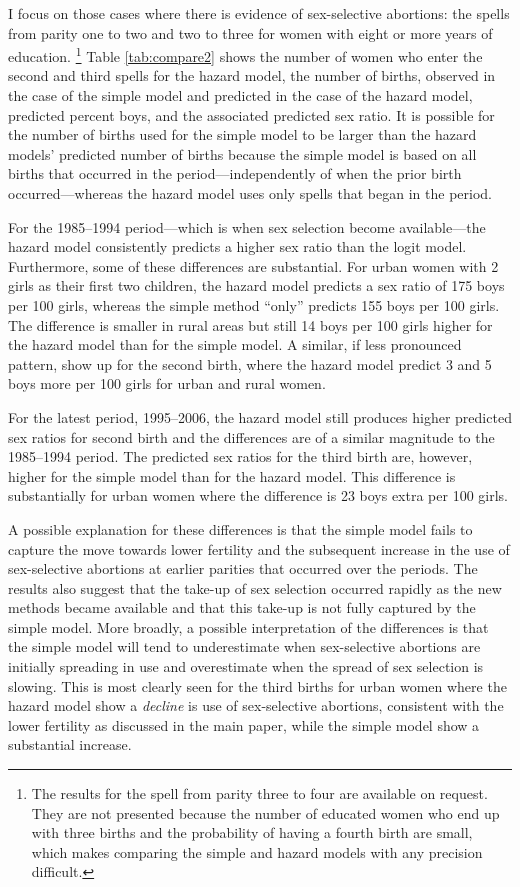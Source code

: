 \documentclass[12pt,letterpaper]{article}
\begin{document}
I focus on those cases where there is evidence of sex-selective abortions: the spells
from parity one to two and two to three for women with eight or more years of education.%
\footnote{
The results for the spell from parity three to four are available on request.
They are not presented because the number of educated women who end up with three births 
and the probability of having a fourth birth are small, which makes
comparing the simple and hazard models with any precision difficult.
}
Table \ref{tab:compare2} shows the number of women who enter the second and third spells
for the hazard model,
the number of births, observed in the case of the simple model and predicted in the case 
of the hazard model, predicted percent boys, and the associated predicted sex ratio.
It is possible for the number of births used for the simple model to be larger than the
hazard models' predicted number of births because the simple model is based
on all births that occurred in the period---independently of when the prior birth
occurred---whereas the hazard model uses only spells that began in the period. 




For the 1985--1994 period---which is when sex selection become available---the 
hazard model consistently predicts a higher sex ratio than the logit model.
Furthermore, some of these differences are substantial.
For urban women with 2 girls as their first two children, the hazard model
predicts a sex ratio of 175 boys per 100 girls, whereas the simple method
``only'' predicts 155 boys per 100 girls.
The difference is smaller in rural areas but still 14 boys per 100 girls
higher for the hazard model than for the simple model.
A similar, if less pronounced pattern, show up for the second birth,
where the hazard model predict 3 and 5 boys more per 100 girls for
urban and rural women.

For the latest period, 1995--2006, the hazard model still produces higher 
predicted sex ratios for second birth and the differences are of a 
similar magnitude to the 1985--1994 period.
The predicted sex ratios for the third birth are, however, 
higher for the simple model than for the hazard model.
This difference is substantially for urban women where the difference 
is 23 boys extra per 100 girls.  

A possible explanation for these differences is that the simple model 
fails to capture the move towards lower fertility and the subsequent 
increase in the use of sex-selective abortions at earlier parities that 
occurred over the periods.
The results also suggest that the take-up of sex selection occurred 
rapidly as the new methods became available and that this take-up
is not fully captured by the simple model.
More broadly, a possible interpretation of the differences is that
the simple model will tend to underestimate when sex-selective abortions
are initially spreading in use and overestimate when the spread of sex 
selection is slowing.
This is most clearly seen for the third births for urban women where
the hazard model show a \emph{decline} is use of sex-selective abortions,
consistent with the lower fertility as discussed in the main paper,
while the simple model show a substantial increase. 
\end{document}
